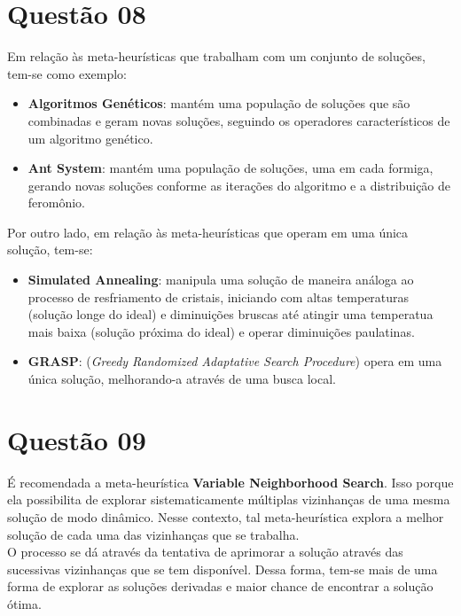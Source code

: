 	\section*{Questão 08}
	Em relação às meta-heurísticas que trabalham com um conjunto de soluções, tem-se como exemplo:
	\begin{itemize}
		\item \textbf{Algoritmos Genéticos}: mantém uma população de soluções que são combinadas e geram novas soluções, seguindo os operadores característicos de um algoritmo genético.
		\item \textbf{Ant System}: mantém uma população de soluções, uma em cada formiga, gerando novas soluções conforme as iterações do algoritmo e a distribuição de feromônio.
	\end{itemize}
	Por outro lado, em relação às meta-heurísticas que operam em uma única solução, tem-se:
	\begin{itemize}
		\item \textbf{Simulated Annealing}: manipula uma solução de maneira análoga ao processo de resfriamento de cristais, iniciando com altas temperaturas (solução longe do ideal) e diminuições bruscas até atingir uma temperatua mais baixa (solução próxima do ideal) e operar diminuições paulatinas.
		\item \textbf{GRASP}: (\textit{Greedy Randomized Adaptative Search Procedure}) opera em uma única solução, melhorando-a através de uma busca local.
	\end{itemize}

	\section*{Questão 09}
	É recomendada a meta-heurística \textbf{Variable Neighborhood Search}. Isso porque ela possibilita de explorar sistematicamente múltiplas vizinhanças de uma mesma solução de modo dinâmico. Nesse contexto, tal meta-heurística explora a melhor solução de cada uma das vizinhanças que se trabalha.\\
	O processo se dá através da tentativa de aprimorar a solução através das sucessivas vizinhanças que se tem disponível. Dessa forma, tem-se mais de uma forma de explorar as soluções derivadas e maior chance de encontrar a solução ótima.

